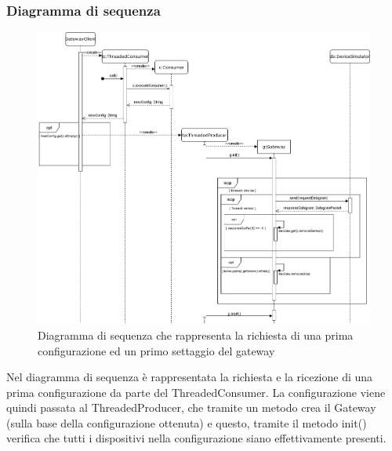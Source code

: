 	\begin{landscape}
		\subsubsection{Diagramma di sequenza}%
		  	\begin{figure}[H]
				\centering
				\includegraphics[scale=0.400]{res/images/GATEWAY/RichiestaInvioGateway.png}
				\caption{Diagramma di sequenza che rappresenta la richiesta di una prima configurazione ed un primo settaggio del gateway}
				\label{Diagramma 3}
			\end{figure}
			Nel diagramma di sequenza è rappresentata la richiesta e la ricezione di una prima configurazione da parte del ThreadedConsumer.
			\newline
			La configurazione viene quindi passata al ThreadedProducer, che tramite un metodo crea il Gateway (sulla base della configurazione ottenuta) e questo, tramite il metodo init() verifica che tutti i dispositivi nella configurazione siano effettivamente presenti.
	\end{landscape}
	
